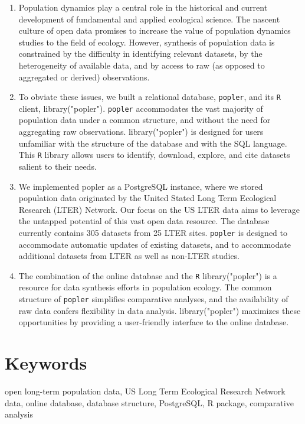 \documentclass{article}\usepackage[]{graphicx}\usepackage[]{color}
\begin{document}
\begin{enumerate}

  \item Population dynamics play a central role in the historical and current development of fundamental and applied ecological science. The nascent culture of open data promises to increase the value of population dynamics studies to the field of ecology. However, synthesis of population data is constrained by the difficulty in identifying relevant datasets, by the heterogeneity of available data, and by access to raw (as opposed to aggregated or derived) observations.
  
  \item To obviate these issues, we built a relational database, \texttt{popler}, and its \texttt{R} client, library("popler"). \texttt{popler} accommodates the vast majority of population data under a common structure, and without the need for aggregating raw observations. library("popler") is  designed for users unfamiliar with the structure of the database and with the SQL language. This \texttt{R} library allows users to identify, download, explore, and cite datasets salient to their needs.
  
  \item We implemented popler as a PostgreSQL instance, where we stored population data originated by the United Stated Long Term Ecological Research (LTER) Network. Our focus on the US LTER data aims to leverage the untapped potential of this vast open data resource. The database currently contains 305 datasets from 25 LTER sites. \texttt{popler} is designed to accommodate automatic updates of existing datasets, and to accommodate additional datasets from LTER as well as non-LTER studies.
  
  \item The combination of the online database and the \texttt{R} library("popler") is a resource for data synthesis efforts in population ecology. The common structure of \texttt{popler} simplifies comparative analyses, and the availability of raw data confers flexibility in data analysis. library("popler") maximizes these opportunities by providing a user-friendly interface to the online database.

   \end{enumerate}
\section*{Keywords}
\linenumbers
open long-term population data, US Long Term Ecological Research Network data, online database, database structure, PostgreSQL, R package, comparative analysis
\end{document}
